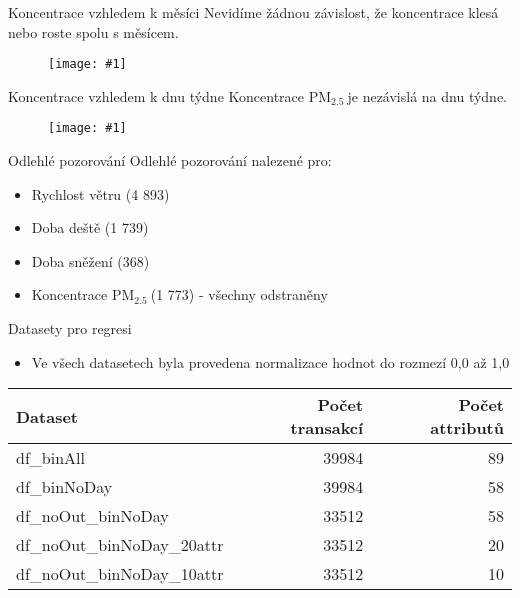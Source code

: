 \documentclass{beamer}%
\newcommand{\pmQuant}[0]{$\text{PM}_{2.5}\:$}
\newcommand{\image}[2]{\begin{figure}[ht!] \centering \texttt{[image: \#1]} \end{figure}}
\begin{document}
\begin{frame}{Koncentrace vzhledem k měsíci}
    Nevidíme žádnou závislost, že koncentrace klesá nebo roste spolu s měsícem.
    \image{../target_by_month_day.pdf}{1.0}
\end{frame}
\begin{frame}{Koncentrace vzhledem k dnu týdne}
    Koncentrace \pmQuant je nezávislá na dnu týdne.
    \image{../target_by_week_day.pdf}{1.0}
\end{frame}
\begin{frame}{Odlehlé pozorování}
    Odlehlé pozorování nalezené pro:
    \begin{itemize}
        \item Rychlost větru (4 893) \footnotemark[1]
        \item Doba deště (1 739) \footnotemark[1]
        \item Doba sněžení (368) \footnotemark[1]
        \item Koncentrace \pmQuant (1 773) - všechny odstraněny
    \end{itemize}
\end{frame}
\begin{frame}{Datasety pro regresi}
    \begin{itemize}
        \item Ve všech datasetech byla provedena normalizace hodnot do rozmezí 0,0 až 1,0
    \end{itemize}
    \begin{table}
        \centering
        \begin{tabular}{l | r | r}
            Dataset                         & Počet transakcí   & Počet attributů \\\hline\hline
            df\_binAll                      & 39984             & 89 \\
            df\_binNoDay                    & 39984             & 58 \\
            df\_noOut\_binNoDay             & 33512             & 58 \\
            df\_noOut\_binNoDay\_20attr     & 33512             & 20 \\  
            df\_noOut\_binNoDay\_10attr     & 33512             & 10 \\
        \end{tabular}
    \end{table}
\end{frame}
\end{document}
